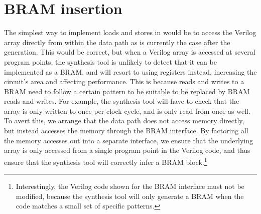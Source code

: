 \section{BRAM insertion}%
\label{sec:hg:bram-insertion}

The simplest way to implement loads and stores in \vericert{} would be to access
the Verilog array directly from within the data path as is currently the case
after the \htl{} generation. This would be correct, but when a Verilog array is
accessed at several program points, the synthesis tool is unlikely to detect
that it can be implemented as a \gls{BRAM}, and will resort to using registers
instead, increasing the circuit's area and affecting performance.  This is
because reads and writes to a \gls{BRAM} need to follow a certain pattern to be
suitable to be replaced by \gls{BRAM} reads and writes.  For example, the
synthesis tool will have to check that the array is only written to once per
clock cycle, and is only read from once as well.  To avert this, we arrange that
the data path does not access memory directly, but instead accesses the memory
through the \gls{BRAM} interface.  By factoring all the memory accesses out into
a separate interface, we ensure that the underlying array is only accessed from
a single program point in the Verilog code, and thus ensure that the synthesis
tool will correctly infer a \gls{BRAM} block.\footnote{Interestingly, the
  Verilog code shown for the \gls{BRAM} interface must not be modified, because
  the synthesis tool will only generate a \gls{BRAM} when the code matches a
  small set of specific patterns.}


